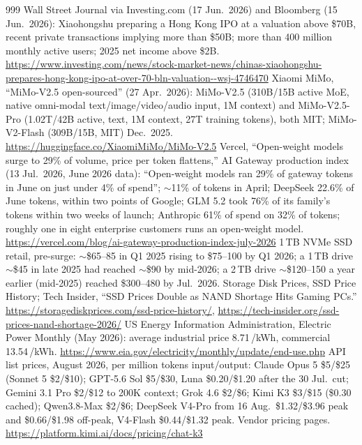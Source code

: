 \begin{thebibliography}{999}
 Wall Street Journal via Investing.com (17 Jun.\ 2026) and Bloomberg (15 Jun.\ 2026): Xiaohongshu preparing a Hong Kong IPO at a valuation above \$70B, recent private transactions implying more than \$50B; more than 400 million monthly active users; 2025 net income above \$2B. \url{https://www.investing.com/news/stock-market-news/chinas-xiaohongshu-prepares-hong-kong-ipo-at-over-70-bln-valuation--wsj-4746470}
 Xiaomi MiMo, ``MiMo-V2.5 open-sourced'' (27 Apr.\ 2026): MiMo-V2.5 (310B/15B active MoE, native omni-modal text/image/video/audio input, 1M context) and MiMo-V2.5-Pro (1.02T/42B active, text, 1M context, 27T training tokens), both MIT; MiMo-V2-Flash (309B/15B, MIT) Dec.\ 2025. \url{https://huggingface.co/XiaomiMiMo/MiMo-V2.5}
 Vercel, ``Open-weight models surge to 29\% of volume, price per token flattens,'' AI Gateway production index (13 Jul.\ 2026, June 2026 data): ``Open-weight models ran 29\% of gateway tokens in June on just under 4\% of spend''; $\sim$11\% of tokens in April; DeepSeek 22.6\% of June tokens, within two points of Google; GLM 5.2 took 76\% of its family's tokens within two weeks of launch; Anthropic 61\% of spend on 32\% of tokens; roughly one in eight enterprise customers runs an open-weight model. \url{https://vercel.com/blog/ai-gateway-production-index-july-2026}
 1\,TB NVMe SSD retail, pre-surge: $\sim$\$65--85 in Q1 2025 rising to \$75--100 by Q1 2026; a 1\,TB drive $\sim$\$45 in late 2025 had reached $\sim$\$90 by mid-2026; a 2\,TB drive $\sim$\$120--150 a year earlier (mid-2025) reached \$300--480 by Jul.\ 2026. Storage Disk Prices, SSD Price History; Tech Insider, ``SSD Prices Double as NAND Shortage Hits Gaming PCs.'' \url{https://storagediskprices.com/ssd-price-history/}, \url{https://tech-insider.org/ssd-prices-nand-shortage-2026/}
 US Energy Information Administration, Electric Power Monthly (May 2026): average industrial price 8.71\,\textcent/kWh, commercial 13.54\,\textcent/kWh. \url{https://www.eia.gov/electricity/monthly/update/end-use.php}
 API list prices, August 2026, per million tokens input/output: Claude Opus 5 \$5/\$25 (Sonnet 5 \$2/\$10); GPT-5.6 Sol \$5/\$30, Luna \$0.20/\$1.20 after the 30 Jul.\ cut; Gemini 3.1 Pro \$2/\$12 to 200K context; Grok 4.6 \$2/\$6; Kimi K3 \$3/\$15 (\$0.30 cached); Qwen3.8-Max \$2/\$6; DeepSeek V4-Pro from 16 Aug.\ \$1.32/\$3.96 peak and \$0.66/\$1.98 off-peak, V4-Flash \$0.44/\$1.32 peak. Vendor pricing pages. \url{https://platform.kimi.ai/docs/pricing/chat-k3}


\end{thebibliography}
